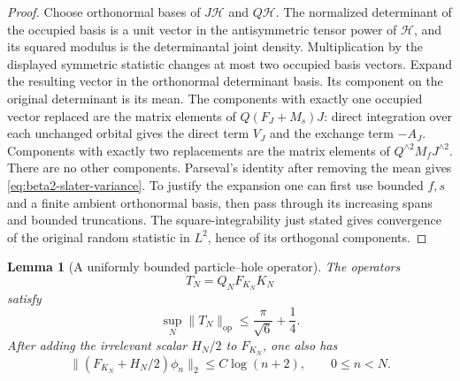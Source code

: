 \documentclass[11pt,a4paper]{article}
\numberwithin{equation}{section}
\newtheorem{lemma}[theorem]{Lemma}
\theoremstyle{definition}
\theoremstyle{remark}
\begin{document}
\begin{proof}
Choose orthonormal bases of $J\mathcal H$ and $Q\mathcal H$.
The normalized determinant of the occupied basis is a unit vector
in the antisymmetric tensor power of $\mathcal H$, and its squared
modulus is the determinantal joint density.  Multiplication by the
displayed symmetric statistic changes at most two occupied basis
vectors.  Expand the resulting vector in the orthonormal determinant
basis.  Its component on the original determinant is its mean.
The components with exactly one occupied vector replaced are the
matrix elements of $Q(F_J+M_s)J$: direct integration over each
unchanged orbital gives the direct term $V_J$ and the exchange term
$-A_J$.  Components with exactly two replacements are the matrix
elements of $Q^{\wedge2}M_fJ^{\wedge2}$.  There are no other
components.  Parseval's identity after removing the mean gives
\eqref{eq:beta2-slater-variance}.  To justify the expansion one can
first use bounded $f,s$ and a finite ambient orthonormal basis, then
pass through its increasing spans and bounded truncations.  The
square-integrability just stated gives convergence of the original
random statistic in $L^2$, hence of its orthogonal components.
\end{proof}

\begin{lemma}[A uniformly bounded particle--hole operator]
\label{lem:beta2-hartree-fock-bound}
The operators
\[
 T_N=Q_NF_{K_N}K_N
\]
satisfy
\begin{equation}
 \sup_N\|T_N\|_{\mathrm{op}}\le\frac\pi{\sqrt6}+\frac14.
 \label{eq:beta2-hartree-fock-bound}
\end{equation}
After adding the irrelevant scalar $H_N/2$ to $F_{K_N}$,
one also has
\begin{equation}
 \|(F_{K_N}+H_N/2)\phi_n\|_2\le C\log(n+2),
 \qquad 0\le n<N.
 \label{eq:beta2-hartree-fock-column}
\end{equation}
\end{lemma}
\end{document}
